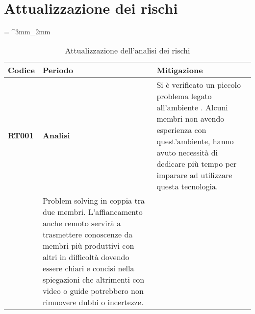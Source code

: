 \documentclass[PianoDiProgetto.tex]{subfiles}
\begin{document}
\chapter{Attualizzazione dei rischi }
\tabulinesep = ^3mm_2mm
\begin{longtabu} to 
	\caption[Attualizzazione dell'analisi dei rischi]{Attualizzazione dell'analisi dei rischi}
	\endlastfoot
	\rowfont{\bfseries\sffamily\leavevmode\color{white}}
	\textbf{Codice} & \textbf{Periodo} & \textbf{Mitigazione} \\
	\endhead
	
	 \textbf{RT001} & \textbf{Analisi} &  {
		Si è verificato un piccolo problema legato all'ambiente . Alcuni membri non avendo esperienza con quest'ambiente, hanno avuto necessità di dedicare più tempo per imparare ad utilizzare questa tecnologia.
	}\\
	\hline

	 & Problem solving in coppia tra due membri.
	 L'affiancamento anche remoto servirà a trasmettere conoscenze da membri più produttivi con altri in difficoltà dovendo essere chiari e concisi nella spiegazioni che altrimenti con video o guide potrebbero non rimuovere dubbi o incertezze.  

\\
\end{longtabu}
\end{document}
